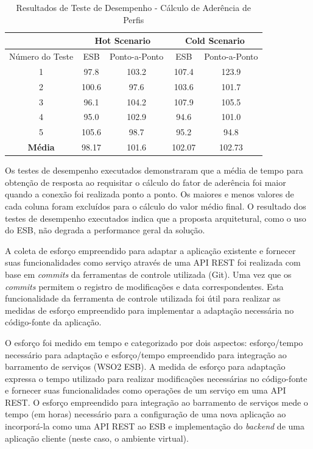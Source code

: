 \begin{table}[!htbp]
\centering
\caption{Resultados de Teste de Desempenho - Cálculo de Aderência de Perfis}
\label{resultado_desempenho}
\begin{tabular}{*5c}
\toprule
  & \multicolumn{2}{c}{Hot Scenario} & \multicolumn{2}{c}{Cold Scenario} \\ 
\midrule
Número do Teste               & ESB   & Ponto-a-Ponto & ESB    & Ponto-a-Ponto \\
1                            & 97.8  &    103.2      & 107.4  &  123.9   \\
2                            & 100.6 &     97.6      & 103.6  &  101.7   \\
3                            & 96.1  &    104.2      & 107.9  &  105.5   \\ 
4                            & 95.0  &    102.9      &  94.6  &  101.0   \\ 
5                            & 105.6 &     98.7      &  95.2  &   94.8   \\ 
\midrule
\textbf{Média}               & 98.17 &    101.6      & 102.07 &  102.73   \\ 
\bottomrule
\end{tabular}
\end{table}

Os testes de desempenho executados demonstraram que a média de tempo para obtenção de resposta ao requisitar o cálculo do fator de aderência foi maior quando a conexão foi realizada ponto a ponto. Os maiores e menos valores de cada coluna foram excluídos para o cálculo do valor médio final. O resultado dos testes de desempenho executados indica que a proposta arquitetural, como o uso do ESB, não degrada a performance geral da solução.

A coleta de esforço empreendido para adaptar a aplicação existente e fornecer suas funcionalidades como serviço através de uma API REST foi realizada com base em \textit{commits} da ferramentas de controle utilizada (Git). Uma vez que os \textit{commits} permitem o registro de modificações e data correspondentes. Esta funcionalidade da ferramenta de controle utilizada foi útil para realizar as medidas de esforço empreendido para implementar a adaptação necessária no código-fonte da aplicação.

O esforço foi medido em tempo e categorizado por dois aspectos: esforço/tempo necessário para adaptação e esforço/tempo empreendido para integração ao barramento de serviços (WSO2 ESB). A medida de esforço para adaptação expressa o tempo utilizado para realizar modificações necessárias no código-fonte e fornecer suas funcionalidades como operações de um serviço em uma API REST. O esforço empreendido para integração ao barramento de serviços mede o tempo (em horas) necessário para a configuração de uma nova aplicação ao incorporá-la como uma API REST ao ESB e implementação do \textit{backend} de uma aplicação cliente (neste caso, o ambiente virtual).

